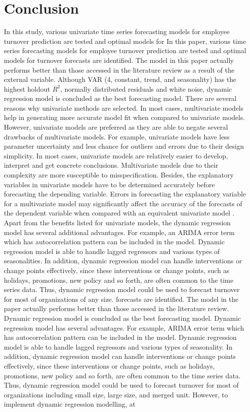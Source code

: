 \section{Conclusion}
In this study, various univariate time series forecasting models for employee turnover prediction are tested and optimal models for In this paper, various time series forecasting models for employee turnover prediction are tested and optimal models for turnover forecasts are identified. The model in this paper actually performs better than those accessed in the literature review as a result of the external variable. Although VAR (4, constant, trend, and seasonality) has the highest holdout $R^2$, normally distributed residuals and white noise, dynamic regression model is concluded as the best forecasting model. There are several reasons why univariate methods are selected. In most cases, multivariate models help in generating more accurate model fit when compared to univariate models. However, univariate models are preferred as they are able to negate several drawbacks of multivariate models. For example, univariate models have less parameter uncertainty and less chance for outliers and errors due to their design simplicity. In most cases, univariate models are relatively easier to develop, interpret and get concrete conclusions. Multivariate models due to their complexity are more susceptible to misspecification. Besides, the explanatory variables in univariate models have to be determined accurately before forecasting the depending variable. Errors in forecasting the explanatory variable for a multivariate model may significantly affect the accuracy of the forecasts of the dependent variable when compared with an equivalent univariate model \citep{chatfield2000}. Apart from the benefits listed for univariate models, the dynamic regression model has several additional advantages. For example, an ARIMA error term which has autocorrelation pattern can be included in the model. Dynamic regression model is able to handle lagged regressors and various types of seasonalities. In addition, dynamic regression model can handle interventions or change points effectively, since these interventions or change points, such as holidays, promotions, new policy and so forth, are often common to the time series data. Thus, dynamic regression model could be used to forecast turnover for most of organizations of any size.  forecasts are identified. The model in the paper actually performs better than those accessed in the literature review. Dynamic regression model is concluded as the best forecasting model. Dynamic regression model has several advantages. For example, ARIMA error term which has autocorrelation pattern can be included in the model. Dynamic regression model is able to handle lagged regressors and various types of seasonality. In addition, dynamic regression model can handle interventions or change points effectively, since these interventions or change points, such as holidays, promotions, new policy and so forth, are often common to the time series data. Thus, dynamic regression model could be used to forecast turnover for most of organizations including small size, large size, and merged unit. However, to implement dynamic regression modelling, at 